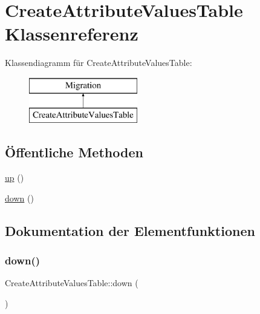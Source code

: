 \hypertarget{classCreateAttributeValuesTable}{}\section{Create\+Attribute\+Values\+Table Klassenreferenz}
\label{classCreateAttributeValuesTable}
Klassendiagramm für Create\+Attribute\+Values\+Table\+:\begin{figure}[H]
\begin{center}
\leavevmode
\includegraphics[height=2.000000cm]{d4/dc8/classCreateAttributeValuesTable}
\end{center}
\end{figure}
\subsection*{Öffentliche Methoden}
\begin{DoxyCompactItemize}
\item 
\hyperlink{classCreateAttributeValuesTable_a289369a7bdc05071c9518281d29abd4e}{up} ()
\item 
\hyperlink{classCreateAttributeValuesTable_a42803174f8e3f7fda9d69c54ab91b1a3}{down} ()
\end{DoxyCompactItemize}


\subsection{Dokumentation der Elementfunktionen}
\mbox{\label{classCreateAttributeValuesTable_a42803174f8e3f7fda9d69c54ab91b1a3}} 
\subsubsection{\texorpdfstring{down()}{down()}}
{\footnotesize\ttfamily Create\+Attribute\+Values\+Table\+::down (\begin{DoxyParamCaption}{ }\end{DoxyParamCaption})}

